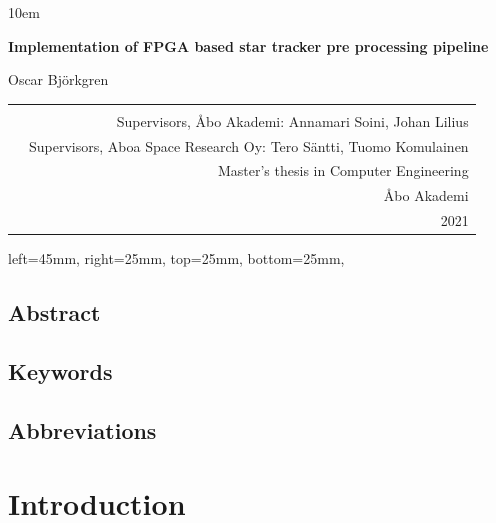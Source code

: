 \documentclass[12pt]{report}
\begin{document}
\emergencystretch 10em
\begin{titlepage}
\begin{center}
        \vspace*{5cm}
        
        \LARGE
        \textbf{Implementation of FPGA based star tracker pre processing pipeline}
        \\
        \vspace{0.5cm}
        
        Oscar Björkgren
        
\end{center}
\vspace{8cm}
\begin{tabular}{l r }
\multirow{4}{10em}{
} \\
\multirow{12}{1em}{
} &

Supervisors, Åbo Akademi: Annamari Soini, Johan Lilius\\ &
Supervisors, Aboa Space Research Oy: Tero Säntti, Tuomo Komulainen\\ & 
Master's thesis in Computer Engineering\\ &
Åbo Akademi\\ &
2021

\end{tabular}

\flushright
\end{titlepage}
\newgeometry
{
 left=45mm,
 right=25mm,
 top=25mm,
 bottom=25mm,
}
\section*{Abstract}
\section*{Keywords}
\section*{Abbreviations}

\tableofcontents
\listoffigures
\listoftables

\chapter{Introduction}
\end{document}
